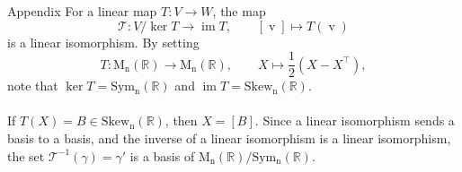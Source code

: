 \documentclass{beamer}
\def\image{\operatorname{im}}
\def\kernel{\operatorname{ker}}
\def\MnR{\operatorname{M_n(\mathbb{R})}}
\def\Sym{\operatorname{Sym_n(\mathbb{R})}}
\def\Skew{\operatorname{Skew_n(\mathbb{R})}}
\def\v{\operatorname{v}}
\begin{document}
        \begin{frame}[t]{Appendix}
                For a linear map $T \colon V \to W$, the map
                \[
                        \mathscr{T}\colon V/\kernel{T} \to \image{T}, \qquad [\v] \mapsto T(\v)
                \]
                is a linear isomorphism. By setting
                \[
                        T\colon \MnR \to \MnR, \qquad X \mapsto \frac{1}{2}(X - X^\top),
                \]
                note that $\kernel{T} = \Sym$ and $\image{T} = \Skew$. \\~\\

                If $T(X) = B \in \Skew$, then $X = [B]$. Since a linear isomorphism sends a basis to a basis, and the inverse of a linear isomorphism
                is a linear isomorphism, the set $\mathscr{T}^{-1}(\gamma) = \gamma'$ is a basis of $\MnR/\Sym$.
        \end{frame}
\end{document}
